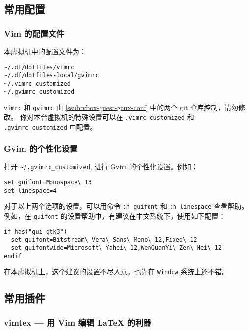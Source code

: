\documentclass[
    11pt,
    cite=authoryear,
    device=normal,
    lang=cn,
    mode=simple,
    result=answer,
    toc=onecol,
]{elegantbook_sierxue}
\begin{document}
\subsection{常用配置}%
\label{sub:vim-intro}

\subsubsection{Vim 的配置文件}%
\label{ssub:vim-config}

本虚拟机中的配置文件为：
\begin{lstlisting}[escapeinside=``]
~/.df/dotfiles/vimrc
~/.df/dotfiles-local/gvimrc
~/.vimrc_customized
~/.gvimrc_customized
\end{lstlisting}
\lstinline{vimrc} 和 \lstinline{gvimrc} 由
\ref{ssub:vbox-guest-ganx-conf} 中的两个 git 仓库控制，请勿修改。
你对本台虚拟机的特殊设置可以在 \lstinline{.vimrc_customized} 和
\lstinline{.gvimrc_customized} 中配置。

\subsubsection{Gvim 的个性化设置}%
\label{ssub:vim-gui-config-customized}

打开 \lstinline{~/.gvimrc_customized}, 进行 Gvim 的个性化设置。例如：
\begin{lstlisting}[escapeinside=``]
set guifont=Monospace\ 13
set linespace=4
\end{lstlisting}
对于以上两个选项的设置，可以用命令 \lstinline{:h guifont} 和
\lstinline{:h linespace} 查看帮助。
例如，在 \lstinline{guifont} 的设置帮助中，有建议在中文系统下，使用如下配置：
\begin{lstlisting}[escapeinside=``]
if has("gui_gtk3")
  set guifont=Bitstream\ Vera\ Sans\ Mono\ 12,Fixed\ 12
  set guifontwide=Microsoft\ Yahei\ 12,WenQuanYi\ Zen\ Hei\ 12
endif
\end{lstlisting}
\begin{note}\label{note:guifont}
    在本虚拟机上，这个建议的设置不尽人意。也许在 \lstinline{Window}
    系统上还不错。
\end{note}

\subsection{常用插件}%
\label{sub:vim-plugins}

\subsubsection{vimtex --- 用 Vim 编辑 \LaTeX{} 的利器}%
\label{ssub:vim-plugin-vimtex}
\end{document}
